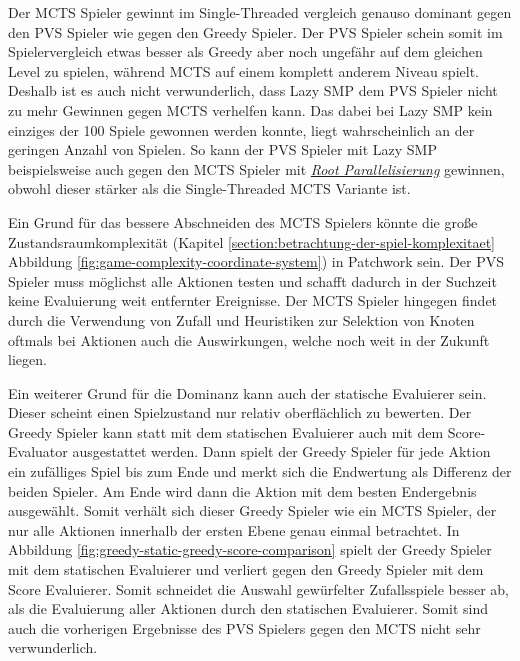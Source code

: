 Der \ac{MCTS} Spieler gewinnt im Single-Threaded vergleich genauso dominant gegen den \ac{PVS} Spieler wie gegen den Greedy Spieler. Der \ac{PVS} Spieler schein somit im Spielervergleich etwas besser als Greedy aber noch ungefähr auf dem gleichen Level zu spielen, während \ac{MCTS} auf einem komplett anderem Niveau spielt. Deshalb ist es auch nicht verwunderlich, dass Lazy \ac{SMP} dem \ac{PVS} Spieler nicht zu mehr Gewinnen gegen \ac{MCTS} verhelfen kann. Das dabei bei Lazy \ac{SMP} kein einziges der 100 Spiele gewonnen werden konnte, liegt wahrscheinlich an der geringen Anzahl von Spielen. So kann der \ac{PVS} Spieler mit Lazy \ac{SMP} beispielsweise auch gegen den \ac{MCTS} Spieler mit \hyperref[text:root-parallelization]{\emph{Root Parallelisierung}} gewinnen, obwohl dieser stärker als die Single-Threaded \ac{MCTS} Variante ist.

Ein Grund für das bessere Abschneiden des \ac{MCTS} Spielers könnte die große Zustandsraumkomplexität (Kapitel \ref{section:betrachtung-der-spiel-komplexitaet} Abbildung \ref{fig:game-complexity-coordinate-system}) in Patchwork sein. Der \ac{PVS} Spieler muss möglichst alle Aktionen testen und schafft dadurch in der Suchzeit keine Evaluierung weit entfernter Ereignisse. Der \ac{MCTS} Spieler hingegen findet durch die Verwendung von Zufall und Heuristiken zur Selektion von Knoten oftmals bei Aktionen auch die Auswirkungen, welche noch weit in der Zukunft liegen.

Ein weiterer Grund für die Dominanz kann auch der statische Evaluierer sein. Dieser scheint einen Spielzustand nur relativ oberflächlich zu bewerten. Der Greedy Spieler kann statt mit dem statischen Evaluierer auch mit dem Score-Evaluator ausgestattet werden. Dann spielt der Greedy Spieler für jede Aktion ein zufälliges Spiel bis zum Ende und merkt sich die Endwertung als Differenz der beiden Spieler. Am Ende wird dann die Aktion mit dem besten Endergebnis ausgewählt. Somit verhält sich dieser Greedy Spieler wie ein \ac{MCTS} Spieler, der nur alle Aktionen innerhalb der ersten Ebene genau einmal betrachtet. In Abbildung \ref{fig:greedy-static-greedy-score-comparison} spielt der Greedy Spieler mit dem statischen Evaluierer und verliert gegen den Greedy Spieler mit dem Score Evaluierer. Somit schneidet die Auswahl gewürfelter Zufallsspiele besser ab, als die Evaluierung aller Aktionen durch den statischen Evaluierer. Somit sind auch die vorherigen Ergebnisse des \ac{PVS} Spielers gegen den \ac{MCTS} nicht sehr verwunderlich.


